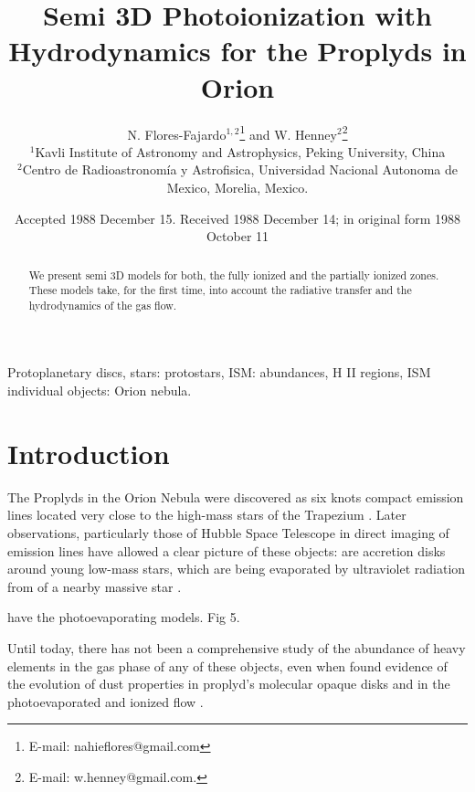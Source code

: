 \documentclass[useAMS,usenatbib]{mn2e}
\title[Semi 3D Photoionization with Hydrodynamics for the Proplyds in Orion]{Semi 3D Photoionization with Hydrodynamics for the Proplyds in Orion}
\author[N. Flores-Fajardo and W. Henney]{N. Flores-Fajardo$^{1,2}$\thanks{E-mail:
nahieflores@gmail.com} and W. Henney$^{2}$\thanks{E-mail:
w.henney@gmail.com.}\\
$^{1}$Kavli Institute of Astronomy and Astrophysics, Peking University, China\\
$^{2}$Centro de Radioastronomía y Astrofisica, Universidad Nacional Autonoma de Mexico, Morelia, Mexico.}
\begin{document}


\date{Accepted 1988 December 15. Received 1988 December 14; in original form 1988 October 11}


\maketitle

\label{firstpage}

\begin{abstract}
We present semi 3D models for both, the fully ionized and the partially ionized zones. These models take, for the first time, into account the radiative transfer and the hydrodynamics of the gas flow.
\end{abstract}

\begin{keywords}
Protoplanetary discs, stars: protostars, ISM: abundances, H II regions, ISM individual objects: Orion nebula.
\end{keywords}

\section{Introduction}
\label{sec:introduction}

The Proplyds in the Orion Nebula were discovered as six knots compact emission lines located very close to the high-mass stars of the Trapezium \citep{1979AA.7397L}. Later observations, particularly those of Hubble Space Telescope in direct imaging of emission lines \citep{1993ApJ410..696O,1998AJ....115..263O,1998AJ....116.1346O} have allowed a clear picture of these objects: are accretion disks around young low-mass stars, which are being evaporated by ultraviolet radiation from of a nearby massive star \citep{1998ApJ499..758J, 1998AJ....116..322H, 1999ApJ515..669S}.

\citep{1999AJ....118.2350H} have the photoevaporating models. Fig 5.

Until today, there has not been a comprehensive study of the abundance of heavy elements in the gas phase of any of these objects, even when found evidence of the evolution of dust properties in proplyd's molecular opaque disks \citep{2003ApJ587L.109S} and in the photoevaporated and ionized flow \citep{2001ApJ...561..830G}.
\end{document}
